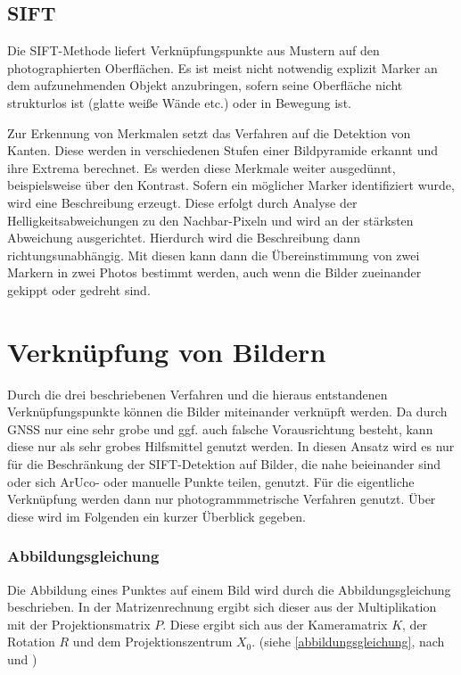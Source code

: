 \documentclass[./00_PhotoBox.tex]{subfiles}
\begin{document}
\subsection{SIFT}
Die SIFT-Methode liefert Verknüpfungspunkte aus Mustern auf den photographierten Oberflächen. Es ist meist nicht notwendig explizit Marker an dem aufzunehmenden Objekt anzubringen, sofern seine Oberfläche nicht strukturlos ist (glatte weiße Wände etc.) oder in Bewegung ist.

Zur Erkennung von Merkmalen setzt das Verfahren auf die Detektion von Kanten. Diese werden in verschiedenen Stufen einer Bildpyramide erkannt und ihre Extrema berechnet. Es werden diese Merkmale weiter ausgedünnt, beispielsweise über den Kontrast. Sofern ein möglicher Marker identifiziert wurde, wird eine Beschreibung erzeugt. Diese erfolgt  durch Analyse der Helligkeitsabweichungen zu den Nachbar-Pixeln und wird an der stärksten Abweichung ausgerichtet. Hierdurch wird die Beschreibung dann richtungsunabhängig. Mit diesen kann dann die Übereinstimmung von zwei Markern in zwei Photos bestimmt werden, auch wenn die Bilder zueinander gekippt oder gedreht sind.
\citep[S. 483]{luhmann4}

\section{Verknüpfung von Bildern}
\label{s:photogramm}
Durch die drei beschriebenen Verfahren und die hieraus entstandenen Verknüpfungs\-punkte können die Bilder miteinander verknüpft werden. Da durch GNSS nur eine sehr grobe und ggf. auch falsche Vorausrichtung besteht, kann diese nur als sehr grobes Hilfsmittel genutzt werden. In diesen Ansatz wird es nur für die Beschränkung der SIFT-Detektion auf Bilder, die nahe beieinander sind oder sich ArUco- oder manuelle Punkte teilen, genutzt.
Für die eigentliche Verknüpfung werden dann nur photogrammmetrische Verfahren genutzt. Über diese wird im Folgenden ein kurzer Überblick gegeben.

\subsubsection{Abbildungsgleichung}
\label{ss:abbildungsgleichung}
Die Abbildung eines Punktes auf einem Bild wird durch die Abbildungsgleichung beschrieben. In der Matrizenrechnung ergibt sich dieser aus der Multiplikation mit der Projektionsmatrix $P$. Diese ergibt sich aus der Kameramatrix $K$, der Rotation $R$ und dem Projektionszentrum $X_0$. (siehe \autoref{abbildungsgleichung}, nach \citealp[S. 244]{hartley} und \citealp[S. 288]{luhmann4})
\end{document}
